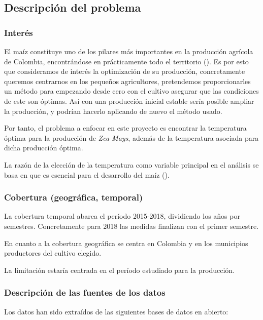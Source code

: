 \documentclass[12pt, spanish]{article}
\begin{document}
\subsection{Descripción del problema}

\subsubsection{Interés}

El maíz constituye uno de los pilares más importantes en la producción agrícola de Colombia, encontrándose en prácticamente todo el territorio (\cite{Fisiomaizfenalce2011}).  
Es por esto que consideramos de interés la optimización de su producción, concretamente queremos centrarnos en los pequeños agricultores, pretendemos proporcionarles un método para empezando desde cero con el cultivo asegurar que las condiciones de este son óptimas. Así con una producción inicial estable sería posible ampliar la producción, y podrían hacerlo aplicando de nuevo el método usado.

Por tanto, el problema a enfocar en este proyecto es encontrar la temperatura óptima para la producción de \textit{Zea Mays}, además de la temperatura asociada para dicha producción óptima. 

La razón de la elección de la temperatura como variable principal en el análisis se basa en que es esencial para el desarrollo del maíz (\cite{Lafitte2001}).


\subsubsection{Cobertura (geográfica, temporal)}

La cobertura temporal abarca el período 2015-2018, dividiendo los años por   semestres. Concretamente para 2018 las medidas finalizan con el primer semestre.

En cuanto a la cobertura geográfica se centra en Colombia y en los municipios productores del cultivo elegido.

La limitación estaría centrada en el período estudiado para la producción.


\subsubsection{Descripción de las fuentes de los datos}

Los datos han sido extraídos de las siguientes bases de datos en abierto: 
\end{document}
